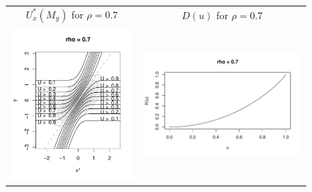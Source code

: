 \documentclass[twoside,11pt]{article}
\newenvironment{myfont}{\fontfamily{phv}\selectfont}{\par}
\begin{document}
\begin{figure}[p]
\centering
\begin{tabular}{cc}
\begin{myfont}$U_x^*(M_y)$ for $\rho=0.7$\end{myfont}
& 
\begin{myfont}$D(u)$ for $\rho = 0.7$\end{myfont}\\
\includegraphics[scale = 0.6, clip = true, trim = 0.1in 0 0 0.8in]{illus_ufunc_0_7.pdf} &
\includegraphics[scale = 0.6, clip = true, trim = 0.22in -0.3in 0 0.5in]{illus_kfunc_0_7.pdf}
\end{tabular}


\end{figure}
\end{document}
